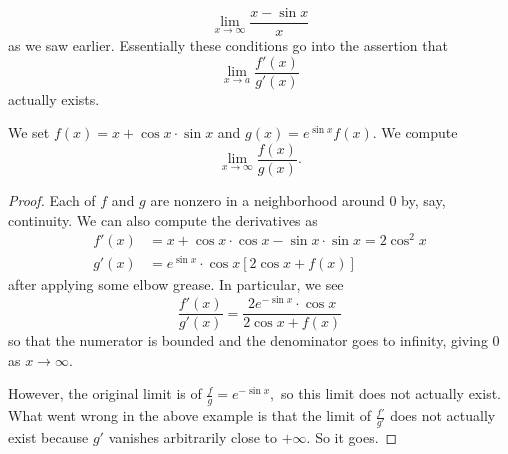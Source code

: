 \documentclass[../notes.tex]{subfiles}
\begin{document}
\[\lim_{x\to\infty}\frac{x-\sin x}x\]
as we saw earlier. Essentially these conditions go into the assertion that
\[\lim_{x\to a}\frac{f'(x)}{g'(x)}\]
actually exists.
\begin{exercise}
	We set $f(x)=x+\cos x\cdot\sin x$ and $g(x)=e^{\sin x}f(x).$ We compute
	\[\lim_{x\to\infty}\frac{f(x)}{g(x)}.\]
\end{exercise}
\begin{proof}
	Each of $f$ and $g$ are nonzero in a neighborhood around $0$ by, say, continuity. We can also compute the derivatives as
	\begin{align*}
		f'(x) &= x+\cos x\cdot\cos x-\sin x\cdot\sin x = 2\cos^2x \\
		g'(x) &= e^{\sin x}\cdot\cos x[2\cos x+f(x)]
	\end{align*}
	after applying some elbow grease. In particular, we see
	\[\frac{f'(x)}{g'(x)}=\frac{2e^{-\sin x}\cdot\cos x}{2\cos x+f(x)}\]
	so that the numerator is bounded and the denominator goes to infinity, giving $0$ as $x\to\infty.$

	However, the original limit is of $\frac fg=e^{-\sin x},$ so this limit does not actually exist. What went wrong in the above example is that the limit of $\frac{f'}{g'}$ does not actually exist because $g'$ vanishes arbitrarily close to $+\infty.$ So it goes.
\end{proof}
\end{document}
